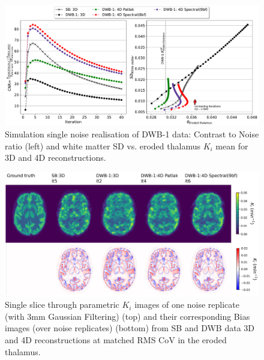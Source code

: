 \begin{figure} [ht!]
\centering
\includegraphics[scale=0.45,angle=0]{3_Results/3_2_Dynamic_Reconstruction_SimulationStudy/figures/Single/3_8_SingleReplicate.pdf}
\caption{Simulation single noise realisation of DWB-1 data: Contrast to Noise ratio (left) and white matter SD vs. eroded thalamus $K_i$ mean for 3D and 4D reconstructions.} 
\label{fig:3_2_SingleReplicateMeanCov}
\end{figure} 

\begin{figure} [h!]
\centering
\includegraphics[scale=0.47,angle=0]{3_Results/3_2_Dynamic_Reconstruction_SimulationStudy/figures/BrainCuts/BrainCuts.pdf}
\caption{Single slice through parametric $K_i$ images of one noise replicate (with 3mm Gaussian Filtering) (top) and their corresponding Bias images (over noise replicates) (bottom) from SB and DWB data 3D and 4D reconstructions at matched RMS CoV in the eroded thalamus.}
\label{fig:cuts_bias_matched_rms_CoV}
\end{figure} 

